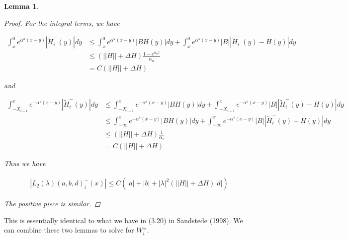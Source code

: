 \documentclass[12pt]{article}
\newtheorem{lemma}{Lemma}
\begin{document}
\begin{lemma}
\begin{proof}
For the integral terms, we have

\begin{align*}
\int_x^0 e^{\alpha^u (x - y)}|\tilde{H}_i^-(y)| dy &\leq \int_x^0 e^{\alpha^u (x - y)}|BH(y)| dy + \int_x^0 e^{\alpha^u (x - y)}|B||\tilde{H}_i^-(y) - H(y)| dy \\
&\leq (||H|| + \Delta H)\frac{1 - e^{\alpha_u x}}{\alpha_u} \\
&= C( ||H|| + \Delta H )
\end{align*}

and

\begin{align*}
\int_{-X_{i-1}}^x e^{-\alpha^s (x - y)}|\tilde{H}_i^-(y)| dy &\leq \int_{-X_{i-1}}^x e^{-\alpha^s (x - y)}|BH(y)| dy + \int_{-X_{i-1}}^x e^{-\alpha^s (x - y)}|B||\tilde{H}_i^-(y) - H(y)| dy \\
&\leq \int_{-\infty}^x e^{-\alpha^s (x - y)}|BH(y)| dy + \int_{-\infty}^x e^{-\alpha^s (x - y)}|B||\tilde{H}_i^-(y) - H(y)| dy \\
&\leq (||H|| + \Delta H)\frac{1}{\alpha_s} \\
&= C( ||H|| + \Delta H )
\end{align*}

Thus we have

\begin{align*}
| L_2(\lambda)(a, b, d)_i^-(x)| \leq C(|a| + |b| + |\lambda|^2 ( ||H|| + \Delta H ) |d|) 
\end{align*}

The positive piece is similar.

\end{proof}

\end{lemma}

This is essentially identical to what we have in (3.20) in Sandstede (1998). We can combine these two lemmas to solve for $W_i^\pm$.
\end{document}
